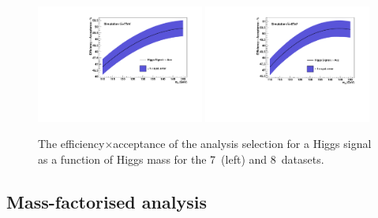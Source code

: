 \begin{figure}
  \includegraphics[width=0.49\textwidth]{analysis/plots/effAcc_vs_mass_7TeV.pdf}
  \includegraphics[width=0.49\textwidth]{analysis/plots/effAcc_vs_mass_8TeV.pdf}
  \caption[The efficiency$\times$acceptance of the analysis selection for \acs{SM} Higgs \acs{MC}]{The efficiency$\times$acceptance of the analysis selection for a \SM Higgs signal as a function of Higgs mass for the 7~\TeV (left) and 8~\TeV datasets.}
  \label{fig:effacc}
\end{figure}

\subsection{Mass-factorised analysis}
\label{sec:signal_mfm}

